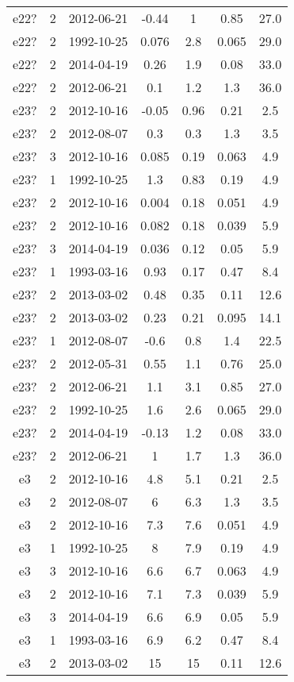 \begin{table*}[htp]
\begin{tabular}{ccccccc}
e22? & 2 & 2012-06-21 & -0.44 & 1 & 0.85 & 27.0 \\
e22? & 2 & 1992-10-25 & 0.076 & 2.8 & 0.065 & 29.0 \\
e22? & 2 & 2014-04-19 & 0.26 & 1.9 & 0.08 & 33.0 \\
e22? & 2 & 2012-06-21 & 0.1 & 1.2 & 1.3 & 36.0 \\
e23? & 2 & 2012-10-16 & -0.05 & 0.96 & 0.21 & 2.5 \\
e23? & 2 & 2012-08-07 & 0.3 & 0.3 & 1.3 & 3.5 \\
e23? & 3 & 2012-10-16 & 0.085 & 0.19 & 0.063 & 4.9 \\
e23? & 1 & 1992-10-25 & 1.3 & 0.83 & 0.19 & 4.9 \\
e23? & 2 & 2012-10-16 & 0.004 & 0.18 & 0.051 & 4.9 \\
e23? & 2 & 2012-10-16 & 0.082 & 0.18 & 0.039 & 5.9 \\
e23? & 3 & 2014-04-19 & 0.036 & 0.12 & 0.05 & 5.9 \\
e23? & 1 & 1993-03-16 & 0.93 & 0.17 & 0.47 & 8.4 \\
e23? & 2 & 2013-03-02 & 0.48 & 0.35 & 0.11 & 12.6 \\
e23? & 2 & 2013-03-02 & 0.23 & 0.21 & 0.095 & 14.1 \\
e23? & 1 & 2012-08-07 & -0.6 & 0.8 & 1.4 & 22.5 \\
e23? & 2 & 2012-05-31 & 0.55 & 1.1 & 0.76 & 25.0 \\
e23? & 2 & 2012-06-21 & 1.1 & 3.1 & 0.85 & 27.0 \\
e23? & 2 & 1992-10-25 & 1.6 & 2.6 & 0.065 & 29.0 \\
e23? & 2 & 2014-04-19 & -0.13 & 1.2 & 0.08 & 33.0 \\
e23? & 2 & 2012-06-21 & 1 & 1.7 & 1.3 & 36.0 \\
e3 & 2 & 2012-10-16 & 4.8 & 5.1 & 0.21 & 2.5 \\
e3 & 2 & 2012-08-07 & 6 & 6.3 & 1.3 & 3.5 \\
e3 & 2 & 2012-10-16 & 7.3 & 7.6 & 0.051 & 4.9 \\
e3 & 1 & 1992-10-25 & 8 & 7.9 & 0.19 & 4.9 \\
e3 & 3 & 2012-10-16 & 6.6 & 6.7 & 0.063 & 4.9 \\
e3 & 2 & 2012-10-16 & 7.1 & 7.3 & 0.039 & 5.9 \\
e3 & 3 & 2014-04-19 & 6.6 & 6.9 & 0.05 & 5.9 \\
e3 & 1 & 1993-03-16 & 6.9 & 6.2 & 0.47 & 8.4 \\
e3 & 2 & 2013-03-02 & 15 & 15 & 0.11 & 12.6 \\

\end{tabular}
\end{table*}
